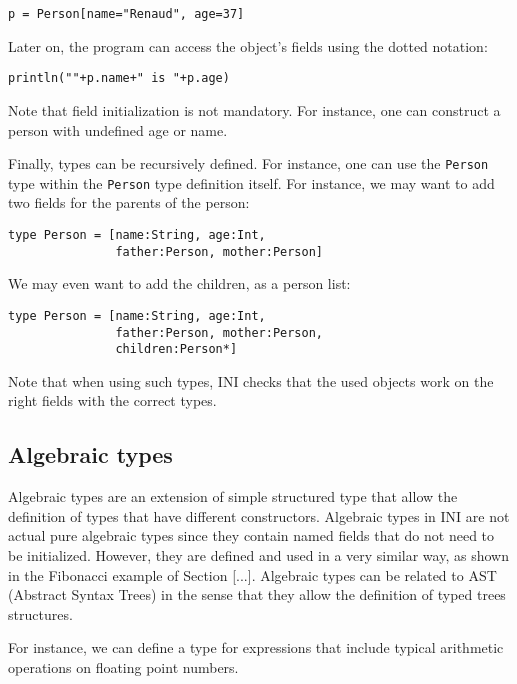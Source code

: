 \documentclass[11pt]{report}
\begin{document}
\begin{lstlisting}[numbers=none]
p = Person[name="Renaud", age=37]
\end{lstlisting}

Later on, the program can access the object's fields using the dotted notation:

\begin{lstlisting}[numbers=none]
println(""+p.name+" is "+p.age)
\end{lstlisting}

Note that field initialization is not mandatory. For instance, one can construct a person with undefined age or name.

Finally, types can be recursively defined. For instance, one can use the \texttt{Person} type within the \texttt{Person} type definition itself. For instance, we may want to add two fields for the parents of the person:

\begin{lstlisting}[numbers=none]
type Person = [name:String, age:Int,
               father:Person, mother:Person]
\end{lstlisting}

We may even want to add the children, as a person list:

\begin{lstlisting}[numbers=none]
type Person = [name:String, age:Int,
               father:Person, mother:Person,
               children:Person*]
\end{lstlisting}

Note that when using such types, INI checks that the used objects work on the right fields with the correct types.

\subsection{Algebraic types}

Algebraic types are an extension of simple structured type that allow the definition of types that have different constructors. Algebraic types in INI are not actual pure algebraic types since they contain named fields that do not need to be initialized. However, they are defined and used in a very similar way, as shown in the Fibonacci example of Section [...]. Algebraic types can be related to AST (Abstract Syntax Trees) in the sense that they allow the definition of typed trees structures.

For instance, we can define a type for expressions that include typical arithmetic operations on floating point numbers.
\end{document}

